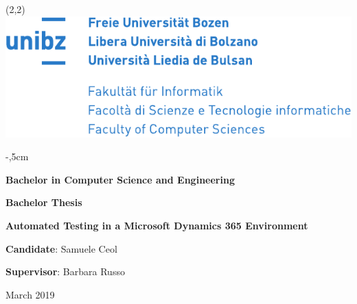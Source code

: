 \documentclass[11pt,a4paper,oneside]{book}
\begin{document}
\frontmatter

\newenvironment{tight_enumerate}{
\begin{enumerate}
  \setlength{\itemsep}{0pt}  
  \setlength{\parskip}{0pt}
}{\end{enumerate}}

\newenvironment{tight_itemize}{
\begin{itemize}
  \setlength{\itemsep}{0pt}
  \setlength{\parskip}{0pt}
}{\end{itemize}}

\newcommand{\wtf}[1]{{\color{red}#1}}

\def\author{Samuele Ceol}
\def\advisor{Barbara Russo}
\def\date{March 2019}

\def\tableheader{Continued from previous page}
\def\tablefooter{Continues on next page}

\begin{titlepage}

  \begin{textblock}{20}(2,2)
    \includegraphics[scale=1.16]{Images/logo.pdf}
  \end{textblock}
  
  {\vspace*{100pt}\parindent0pt\large
  
  \begin{addmargin}[1.6cm]{-,5cm}
  \textbf{}
  
  \vspace{2cm}
  {\fontsize{15pt}{18pt}\hspace{-3pt}\selectfont\textbf{Bachelor in Computer Science and Engineering}}
  \vspace{1,5cm}

  {\fontsize{15pt}{18pt}\textbf{Bachelor Thesis}}
  \vspace{0,5cm}

  {\fontsize{23pt}{21pt}\textbf{Automated Testing in a Microsoft \newline Dynamics 365 Environment}}

  \vspace{5cm}
  \Large{\textbf{Candidate}: \author}

  \vspace{1cm}
  \textbf{Supervisor}: \advisor

  \vspace{1cm}
  
  \date
  
  \end{addmargin} 
  }

\end{titlepage}
\end{document}
